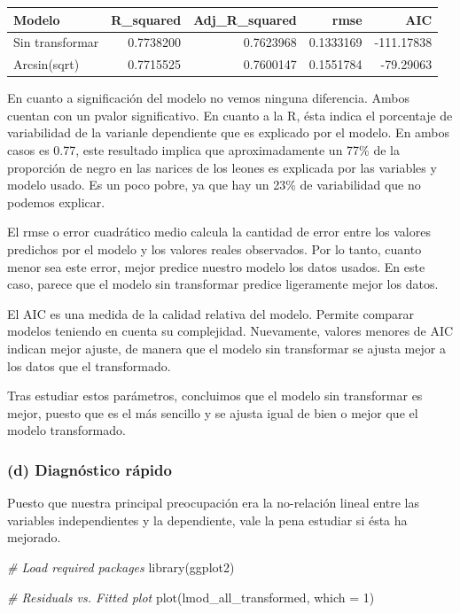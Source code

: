 \documentclass[
]{article}
\newenvironment{Shaded}{\begin{snugshade}}{\end{snugshade}}
\newcommand{\AttributeTok}[1]{\textcolor[rgb]{0.77,0.63,0.00}{#1}}
\newcommand{\CommentTok}[1]{\textcolor[rgb]{0.56,0.35,0.01}{\textit{#1}}}
\newcommand{\DecValTok}[1]{\textcolor[rgb]{0.00,0.00,0.81}{#1}}
\newcommand{\FunctionTok}[1]{\textcolor[rgb]{0.00,0.00,0.00}{#1}}
\newcommand{\NormalTok}[1]{#1}
\begin{document}
\begin{longtable}[]{@{}lrrrr@{}}
\toprule()
Modelo & R\_squared & Adj\_R\_squared & rmse & AIC \\
\midrule()
\endhead
Sin transformar & 0.7738200 & 0.7623968 & 0.1333169 & -111.17838 \\
Arcsin(sqrt) & 0.7715525 & 0.7600147 & 0.1551784 & -79.29063 \\
\bottomrule()
\end{longtable}

En cuanto a significación del modelo no vemos ninguna diferencia. Ambos
cuentan con un pvalor significativo. En cuanto a la R, ésta indica el
porcentaje de variabilidad de la varianle dependiente que es explicado
por el modelo. En ambos casos es 0.77, este resultado implica que
aproximadamente un 77\% de la proporción de negro en las narices de los
leones es explicada por las variables y modelo usado. Es un poco pobre,
ya que hay un 23\% de variabilidad que no podemos explicar.

El rmse o error cuadrático medio calcula la cantidad de error entre los
valores predichos por el modelo y los valores reales observados. Por lo
tanto, cuanto menor sea este error, mejor predice nuestro modelo los
datos usados. En este caso, parece que el modelo sin transformar predice
ligeramente mejor los datos.

El AIC es una medida de la calidad relativa del modelo. Permite comparar
modelos teniendo en cuenta su complejidad. Nuevamente, valores menores
de AIC indican mejor ajuste, de manera que el modelo sin transformar se
ajusta mejor a los datos que el transformado.

Tras estudiar estos parámetros, concluimos que el modelo sin transformar
es mejor, puesto que es el más sencillo y se ajusta igual de bien o
mejor que el modelo transformado.

\hypertarget{d-diagnuxf3stico-ruxe1pido}{%
\subsubsection{(d) Diagnóstico
rápido}\label{d-diagnuxf3stico-ruxe1pido}}

Puesto que nuestra principal preocupación era la no-relación lineal
entre las variables independientes y la dependiente, vale la pena
estudiar si ésta ha mejorado.

\begin{Shaded}
\begin{Highlighting}[]
\CommentTok{\# Load required packages}
\FunctionTok{library}\NormalTok{(ggplot2)}

\CommentTok{\# Residuals vs. Fitted plot}
\FunctionTok{plot}\NormalTok{(lmod\_all\_transformed, }\AttributeTok{which =} \DecValTok{1}\NormalTok{)}
\end{Highlighting}
\end{Shaded}
\end{document}
